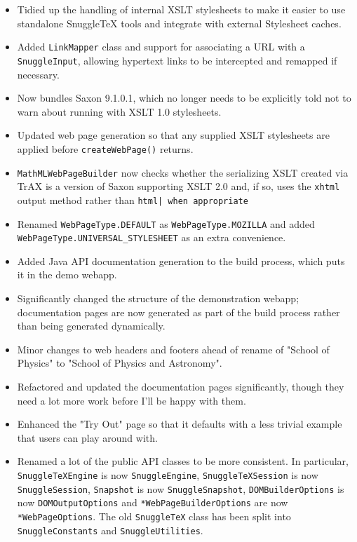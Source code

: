 \begin{itemize}
  \item Tidied up the handling of internal XSLT stylesheets to make it easier
  to use standalone SnuggleTeX tools and integrate with external Stylesheet
  caches.

  \item Added \verb|LinkMapper| class and support for associating a URL with a
  \verb|SnuggleInput|, allowing hypertext links to be intercepted and remapped
  if necessary.

  \item Now bundles Saxon 9.1.0.1, which no longer needs to be explicitly told
  not to warn about running with XSLT 1.0 stylesheets.

  \item Updated web page generation so that any supplied XSLT stylesheets are
  applied before \verb|createWebPage()| returns.

  \item \verb|MathMLWebPageBuilder| now checks whether the serializing XSLT
  created via TrAX is a version of Saxon supporting XSLT 2.0 and, if so,
  uses the \verb|xhtml| output method rather than \verb.html| when appropriate.

  \item Renamed \verb|WebPageType.DEFAULT| as \verb|WebPageType.MOZILLA| and
  added \verb|WebPageType.UNIVERSAL_STYLESHEET| as an extra convenience.

  \item Added Java API documentation generation to the build process, which
  puts it in the demo webapp.

  \item Significantly changed the structure of the demonstration webapp;
  documentation pages are now generated as part of the build process rather
  than being generated dynamically.

  \item Minor changes to web headers and footers ahead of rename of "School of
  Physics" to "School of Physics and Astronomy".

  \item Refactored and updated the documentation pages significantly, though
  they need a lot more work before I'll be happy with them.

  \item Enhanced the "Try Out" page so that it defaults with a less trivial
  example that users can play around with.

  \item Renamed a lot of the public API classes to be more consistent. In
  particular, \verb|SnuggleTeXEngine| is now \verb|SnuggleEngine|,
  \verb|SnuggleTeXSession| is now \verb|SnuggleSession|,
  \verb|Snapshot| is now \verb|SnuggleSnapshot|,
  \verb|DOMBuilderOptions| is now \verb|DOMOutputOptions| and
  \verb|*WebPageBuilderOptions| are now \verb|*WebPageOptions|.
  The old \verb|SnuggleTeX| class has been split into \verb|SnuggleConstants|
  and \verb|SnuggleUtilities|.

\end{itemize}

